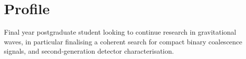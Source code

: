 \section{Profile}
Final year postgraduate student looking to continue research in gravitational waves, in particular finalising a coherent search for compact binary coalescence signals, and second-generation detector characterisation.
